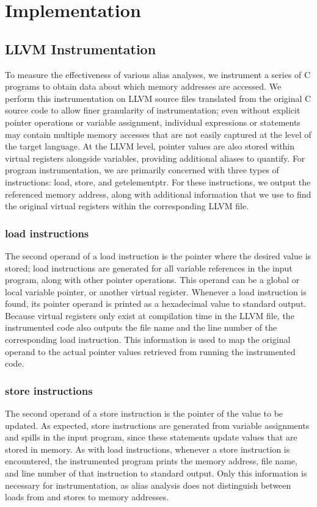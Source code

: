 \chapter{Implementation}

\section{LLVM Instrumentation}
To measure the effectiveness of various alias analyses, we instrument a series of C programs to obtain data about which memory addresses are accessed. We perform this instrumentation on LLVM source files translated from the original C source code to allow finer granularity of instrumentation; even without explicit pointer operations or variable assignment, individual expressions or statements may contain multiple memory accesses that are not easily captured at the level of the target language. At the LLVM level, pointer values are also stored within virtual registers alongside variables, providing additional aliases to quantify. For program instrumentation, we are primarily concerned with three types of instructions: load, store, and getelementptr. For these instructions, we output the referenced memory address, along with additional information that we use to find the original virtual registers within the corresponding LLVM file.

\subsection{load instructions}
The second operand of a load instruction is the pointer where the desired value is stored; load instructions are generated for all variable references in the input program, along with other pointer operations. This operand can be a global or local variable pointer, or another virtual register. Whenever a load instruction is found, its pointer operand is printed as a hexadecimal value to standard output. Because virtual registers only exist at compilation time in the LLVM file, the instrumented code also outputs the file name and the line number of the corresponding load instruction. This information is used to map the original operand to the actual pointer values retrieved from running the instrumented code.

\subsection{store instructions}
The second operand of a store instruction is the pointer of the value to be updated. As expected, store instructions are generated from variable assignments and spills in the input program, since these statements update values that are stored in memory. As with load instructions, whenever a store instruction is encountered, the instrumented program prints the memory address, file name, and line number of that instruction to standard output. Only this information is necessary for instrumentation, as alias analysis does not distinguish between loads from and stores to memory addresses.

